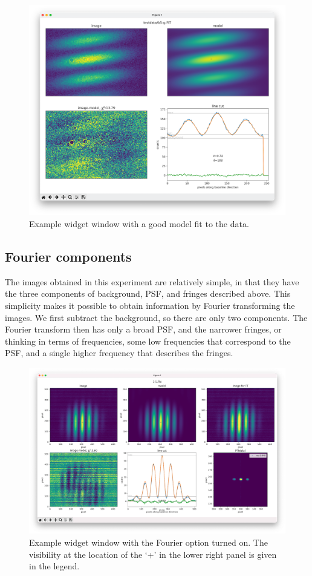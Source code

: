 \documentclass[11pt]{article}
\begin{document}
\begin{figure}[h]
    \centering
    \includegraphics[width=1\textwidth]{widget2.png}
    \caption{Example widget window with a good model fit to the data.}
    \label{fig:widget2}
\end{figure}

\subsection{Fourier components}\label{sec:fourier}

The images obtained in this experiment are relatively simple, in that they have the three components of background, PSF, and fringes described above. This simplicity makes it possible to obtain information by Fourier transforming the images. We first subtract the background, so there are only two components. The Fourier transform then has only a broad PSF, and the narrower fringes, or thinking in terms of frequencies, some low frequencies that correspond to the PSF, and a single higher frequency that describes the fringes.

\begin{figure}[h]
    \centering
   \includegraphics[width=1\textwidth]{widget-fourier.png}
    \caption{Example widget window with the Fourier option turned on. The visibility at the location of the `+' in the lower right panel is given in the legend.}
    \label{fig:widget-f}
\end{figure}
\end{document}
